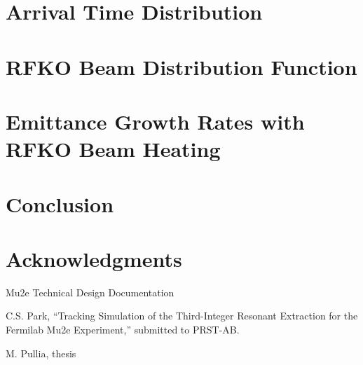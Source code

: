 \documentclass[aps,prstab,onecolumn,preprint,endfloats,11pt]{revtex4-1}
\begin{document}
\section{\label{sec:arrival}Arrival Time Distribution}

\section{\label{sec:rfko}RFKO Beam Distribution Function}

\section{\label{sec:emit}Emittance Growth Rates with RFKO Beam Heating}

\section{\label{sec:conclusion}Conclusion}

\section{\label{thanks}Acknowledgments}

\begin{thebibliography}{77}

  Mu2e Technical Design Documentation

  C.S. Park, ``Tracking Simulation of the Third-Integer Resonant Extraction for the Fermilab Mu2e Experiment,'' submitted to PRST-AB.

  M. Pullia, thesis

\end{thebibliography}

\clearpage
\end{document}
